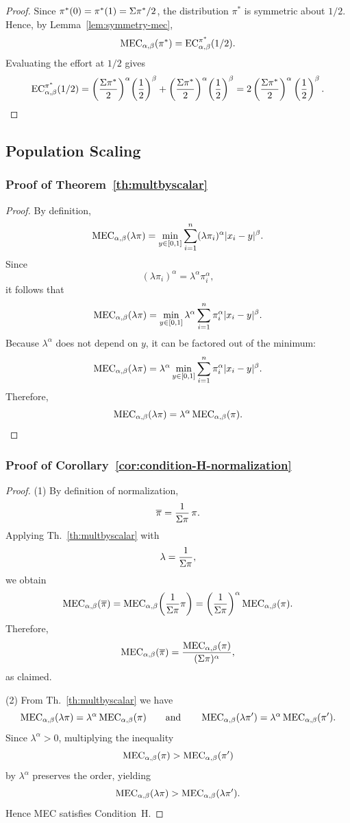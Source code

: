 \mecPiStar*
\begin{proof}
Since $\pi^*(0)=\pi^*(1)=\Sigma \pi^*/2$, the distribution $\pi^*$ is symmetric about $1/2$. Hence, by Lemma~\ref{lem:symmetry-mec},
\[
\MEC(\pi^*)=\EC[\alpha,\beta][\pi^*](1/2).
\]
Evaluating the effort at $1/2$ gives
\[
\EC[\alpha,\beta][\pi^*](1/2)
=
\left(\frac{\Mass{\pi^*}}{2}\right)^\alpha\!\left(\frac12\right)^\beta
+
\left(\frac{\Mass{\pi^*}}{2}\right)^\alpha\!\left(\frac12\right)^\beta
=
2\left(\frac{\Mass{\pi^*}}{2}\right)^\alpha\left(\frac12\right)^\beta.
\]
\end{proof}

\subsection{Population Scaling}

\subsubsection{Proof of Theorem~\ref{th:multbyscalar}}
\label{appendix:proof-population-scaling}

\multByScalar*
\begin{proof}
By definition,
\[
\MEC(\lambda\pi)
=
\min_{y\in[0,1]}
\sum_{i=1}^{n}(\lambda\pi_i)^{\alpha}|x_i-y|^{\beta}.
\]
Since
\[
(\lambda\pi_i)^{\alpha}=\lambda^{\alpha}\pi_i^{\alpha},
\]
it follows that
\[
\MEC(\lambda\pi)
=
\min_{y\in[0,1]}
\lambda^{\alpha}\sum_{i=1}^{n}\pi_i^{\alpha}|x_i-y|^{\beta}.
\]
Because $\lambda^{\alpha}$ does not depend on $y$, it can be factored out of the minimum:
\[
\MEC(\lambda\pi)
=
\lambda^{\alpha}
\min_{y\in[0,1]}
\sum_{i=1}^{n}\pi_i^{\alpha}|x_i-y|^{\beta}.
\]
Therefore,
\[
\MEC(\lambda\pi)=\lambda^{\alpha}\MEC(\pi).
\]
\end{proof}

\subsubsection{Proof of Corollary~\ref{cor:condition-H-normalization}}
\label{appendix:proof-condition-H-normalization}

\conditionH*
\begin{proof}
(1) By definition of normalization,
\[
\overline{\pi}=\frac{1}{\Sigma \pi}\,\pi.
\]
Applying Th.~\ref{th:multbyscalar} with
\[
\lambda=\frac{1}{\Sigma \pi},
\]
we obtain
\[
\MEC(\overline{\pi})
=
\MEC\!\left(\frac{1}{\Mass{\pi}}\pi\right)
=
\left(\frac{1}{\Mass{\pi}}\right)^\alpha \MEC(\pi).
\]
Therefore,
\[
\MEC(\overline{\pi})
=
\frac{\MEC(\pi)}{(\Mass{\pi})^\alpha},
\]
as claimed.

(2) From Th.~\ref{th:multbyscalar} we have
\[
\MEC(\lambda\pi)=\lambda^{\alpha}\MEC(\pi)
\qquad\text{and}\qquad
\MEC(\lambda\pi')=\lambda^{\alpha}\MEC(\pi').
\]
Since $\lambda^{\alpha}>0$, multiplying the inequality
\[
\MEC(\pi)>\MEC(\pi')
\]
by $\lambda^{\alpha}$ preserves the order, yielding
\[
\MEC(\lambda\pi)>\MEC(\lambda\pi').
\]
Hence MEC satisfies Condition~H.
\end{proof}


